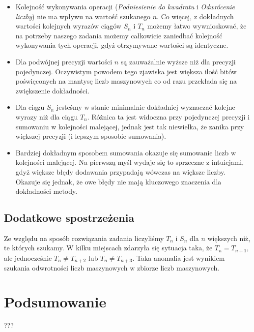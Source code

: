 \documentclass[12pt,a4paper]{article}
\begin{document}
\begin{itemize}
	\item Kolejność wykonywania operacji (\textit{Podniesienie do kwadratu} i \textit{Odwrócenie liczby}) nie ma wpływu na wartość szukanego $n$. Co więcej, z dokładnych wartości kolejnych wyrazów ciągów $S_n$ i $T_n$ możemy łatwo wywnioskować, że na potrzeby naszego zadania możemy całkowicie zaniedbać kolejność wykonywania tych operacji, gdyż otrzymywane wartości są identyczne.
  	\item Dla podwójnej precyzji wartości $n$ są zauważalnie wyższe niż dla precyzji pojedynczej. Oczywistym powodem tego zjawiska jest większa ilość bitów poświęconych na mantysę liczb maszynowych co od razu przekłada się na zwiększenie dokładności.
  	\item Dla ciągu $S_n$ jesteśmy w stanie minimalnie dokładniej wyznaczać kolejne wyrazy niż dla ciągu $T_n$. Różnica ta jest widoczna przy pojedynczej precyzji i sumowaniu w kolejności malejącej, jednak jest tak niewielka, że zanika przy większej precyzji (i lepszym sposobie sumowania).
  	\item Bardziej dokładnym sposobem sumowania okazuje się sumowanie liczb w kolejności malejącej. Na pierwszą myśl wydaje się to sprzeczne z intuicjami, gdyż większe błędy dodawania przypadają wówczas na większe liczby. Okazuje się jednak, że owe błędy nie mają kluczowego znaczenia dla dokładności metody. 
\end{itemize}

\subsection{Dodatkowe spostrzeżenia}
Ze względu na sposób rozwiązania zadania liczyliśmy $T_n$ i $S_n$ dla $n$ większych niż, te których szukamy. W kilku miejscach zdarzyła się sytuacja taka, że $T_n = T_{n + 1}$, ale jednocześnie $T_n \neq T_{n + 2}$ lub $T_n \neq T_{n + 3}$. Taka anomalia jest wynikiem szukania odwrotności liczb maszynowych w zbiorze liczb maszynowych.

\section{Podsumowanie}
???
\end{document}
